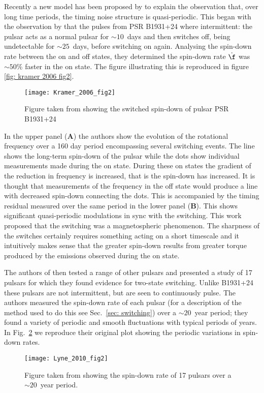 Recently a new model has been proposed by \citet{Lyne2010} to explain the
observation that, over long time periods, the timing noise structure is
quasi-periodic. This began with the observation by \citet{Kramer2006} that the
pulses from PSR B1931+24 where intermittent: the pulsar acts as a normal pulsar
for $\sim10$~days and then switches off, being undetectable for $\sim25$~days,
before switching on again. Analysing the spin-down rate between the on and off
states, they determined the spin-down rate $\dot{\f}$ was $\sim50\%$ faster in
the on state. The figure illustrating this is reproduced in figure \ref{fig:
kramer 2006 fig2}.
\begin{figure}
    \centering
    \texttt{[image: Kramer\_2006\_fig2]}
    \caption{Figure taken from \citet{Kramer2006} showing the switched spin-down
             of pulsar PSR B1931+24}
    \label{fig: kramer 2006 fig2}
\end{figure}
In the  upper panel (\textbf{A}) the authors show the evolution of the
rotational frequency over a 160 day period encompassing several switching
events. The line shows the long-term spin-down of the pulsar while the dots show
individual measurements made during the on state. During these on states the
gradient of the reduction in frequency is increased, that is the spin-down has
increased. It is thought that measurements of the frequency in the off state
would produce a line with decreased spin-down connecting the dots. This is
accompanied by the timing residual measured over the same period in the lower
panel (\textbf{B}). This shows significant quasi-periodic modulations in sync
with the switching. This work proposed that the switching was a magnetospheric
phenomenon. The sharpness of the switches certainly requires something acting
on a short timescale and it intuitively makes sense that the greater spin-down
results from greater torque produced by the emissions observed during the on
state.

The authors of \citet{Lyne2010} then tested a range of other pulsars and
presented a study of 17 pulsars for which they found evidence for two-state
switching. Unlike B1931+24 these pulsars are not intermittent, but are seen to
continuously pulse.
The authors measured the spin-down rate of each pulsar (for a description of the
method used to do this see Sec.~\ref{sec: switching}) over a
$\sim20$~year period; they found a variety of periodic and smooth fluctuations
with typical periods of years. In Fig.~\ref{fig: lyne 2010 fig2} we reproduce
their original plot showing the periodic variations in spin-down rates.
\begin{figure}
    \centering
    \texttt{[image: Lyne\_2010\_fig2]}
    \caption{Figure taken from \citet{Lyne2010} showing the spin-down rate
             of 17 pulsars over a $\sim20$~year period.}
    \label{fig: lyne 2010 fig2}
\end{figure}

